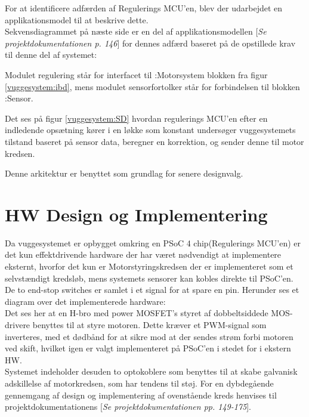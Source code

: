 For at identificere adfærden af Regulerings MCU'en, blev der udarbejdet en applikationsmodel til at beskrive dette.\\Sekvensdiagrammet på næste side er en del af applikationsmodellen [\textit{Se projektdokumentationen p. 146}] for dennes adfærd baseret på de opstillede krav til denne del af systemet:


Modulet regulering står for interfacet til :Motorsystem blokken fra figur \ref{vuggesystem:ibd}, mens modulet sensorfortolker står for forbindelsen til blokken :Sensor.

Det ses på figur \ref{vuggesystem:SD} hvordan regulerings MCU'en efter en indledende opsætning kører i en løkke som konstant undersøger vuggesystemets tilstand baseret på sensor data, beregner en korrektion, og sender denne til motor kredsen.

Denne arkitektur er benyttet som grundlag for senere designvalg.

\newpage
\section{HW Design og Implementering}
\label{vs_HW}
Da vuggesystemet er opbygget omkring en PSoC 4 chip(Regulerings MCU'en) er det kun effektdrivende hardware der har været nødvendigt at implementere eksternt, hvorfor det kun er Motorstyringskredsen der er implementeret som et selvstændigt kredsløb, mens systemets sensorer kan kobles direkte til PSoC'en. De to end-stop switches er samlet i et signal for at spare en pin. Herunder ses et diagram over det implementerede hardware:\\
Det ses her at en H-bro med power MOSFET's styret af dobbeltsiddede MOS-drivere benyttes til at styre motoren. Dette kræver et PWM-signal som inverteres, med et dødbånd for at sikre mod at der sendes strøm forbi motoren ved skift, hvilket igen er valgt implementeret på PSoC'en i stedet for i ekstern HW. \\ Systemet indeholder desuden to optokoblere som benyttes til at skabe galvanisk adskillelse af motorkredsen, som har tendens til støj.
For en dybdegående gennemgang af design og implementering af ovenstående kreds henvises til projektdokumentationens [\textit{Se projektdokumentationen pp. 149-175}].\\



